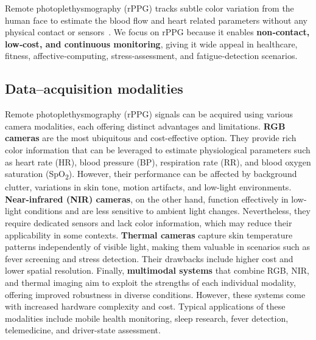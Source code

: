 Remote photoplethysmography (rPPG) tracks subtle color variation from the human face to estimate  the blood flow and heart related parameters without any physical contact or sensors~\cite{9050507}.  
We focus on rPPG because it enables \textbf{non‑contact, low‑cost, and continuous monitoring}, giving it wide appeal in healthcare, fitness, affective‑computing, stress‑assessment, and fatigue‑detection scenarios.

\subsection{Data–acquisition modalities}


Remote photoplethysmography (rPPG) signals can be acquired using various camera modalities, each offering distinct advantages and limitations. \textbf{RGB cameras} are the most ubiquitous and cost-effective option. They provide rich color information that can be leveraged to estimate physiological parameters such as heart rate (HR), blood pressure (BP), respiration rate (RR), and blood oxygen saturation (SpO\textsubscript{2}). However, their performance can be affected by background clutter, variations in skin tone, motion artifacts, and low-light environments. \textbf{Near-infrared (NIR) cameras}, on the other hand, function effectively in low-light conditions and are less sensitive to ambient light changes. Nevertheless, they require dedicated sensors and lack color information, which may reduce their applicability in some contexts. \textbf{Thermal cameras} capture skin temperature patterns independently of visible light, making them valuable in scenarios such as fever screening and stress detection. Their drawbacks include higher cost and lower spatial resolution. Finally, \textbf{multimodal systems} that combine RGB, NIR, and thermal imaging aim to exploit the strengths of each individual modality, offering improved robustness in diverse conditions. However, these systems come with increased hardware complexity and cost. Typical applications of these modalities include mobile health monitoring, sleep research, fever detection, telemedicine, and driver-state assessment.




